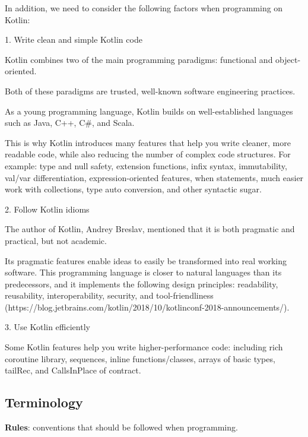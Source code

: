 In addition, we need to consider the following factors when programming on Kotlin:



1. Write clean and simple Kotlin code



    Kotlin combines two of the main programming paradigms: functional and object-oriented.

    Both of these paradigms are trusted, well-known software engineering practices.

    As a young programming language, Kotlin builds on well-established languages such as Java, C++, C\#, and Scala.

    This is why Kotlin introduces many features that help you write cleaner, more readable code, while also reducing the number of complex code structures. For example: type and null safety, extension functions, infix syntax, immutability, val/var differentiation, expression-oriented features, when statements, much easier work with collections, type auto conversion, and other syntactic sugar.



2. Follow Kotlin idioms



    The author of Kotlin, Andrey Breslav, mentioned that it is both pragmatic and practical, but not academic.

    Its pragmatic features enable ideas to easily be transformed into real working software. This programming language is closer to natural languages than its predecessors, and it implements the following design principles: readability, reusability, interoperability, security, and tool-friendliness (https://blog.jetbrains.com/kotlin/2018/10/kotlinconf-2018-announcements/).



3. Use Kotlin efficiently



    Some Kotlin features help you write higher-performance code: including rich coroutine library, sequences, inline functions/classes, arrays of basic types, tailRec, and CallsInPlace of contract.



\subsection*{\textbf{Terminology}}



\textbf{Rules}: conventions that should be followed when programming.



